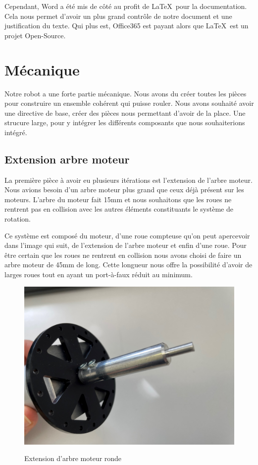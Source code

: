 \documentclass[
	a4paper,									%
	11pt,										%
	twoside,									%
	openright,									%
	notitlepage,									%
	parskip=half,								%
]{scrreprt}										%
\begin{document}
Cependant, Word a été mis de côté au profit de \LaTeX\ pour la documentation. Cela nous permet d'avoir
un plus grand contrôle de notre document et une justification du texte. Qui plus est, Office365 
est payant alors que \LaTeX\ est un projet Open-Source. \par

\chapter{Mécanique}

Notre robot a une forte partie mécanique. Nous avons du créer toutes les pièces pour construire un ensemble
cohérent qui puisse rouler. Nous avons souhaité avoir une directive de base, créer des pièces nous permettant
d'avoir de la place. Une strucure large, pour y intégrer les différents composants que nous souhaiterions intégré. \par

\section{Extension arbre moteur}

La première pièce à avoir eu plusieurs itérations est l'extension de l'arbre moteur. Nous avions besoin d'un 
arbre moteur plus grand que ceux déjà présent sur les moteurs. L'arbre du moteur fait 15mm et nous souhaitons 
que les roues ne rentrent pas en collision avec les autres éléments constituants le système de rotation. \par

Ce système est composé du moteur, d'une roue compteuse qu'on peut apercevoir dans l'image qui suit, de l'extension
de l'arbre moteur et enfin d'une roue. Pour être certain que les roues ne rentrent en collision nous avons choisi
de faire un arbre moteur de 45mm de long. Cette longueur nous offre la possibilité d'avoir de larges roues tout en ayant 
un port-à-faux réduit au minimum. \par

\begin{figure}[!ht]
	\centering
	\includegraphics[scale=.1]{img/ExtensionArbreMoteur.jpg}
	\label{ExtensionRound}
	\caption{Extension d'arbre moteur ronde}
\end{figure}
\end{document}
